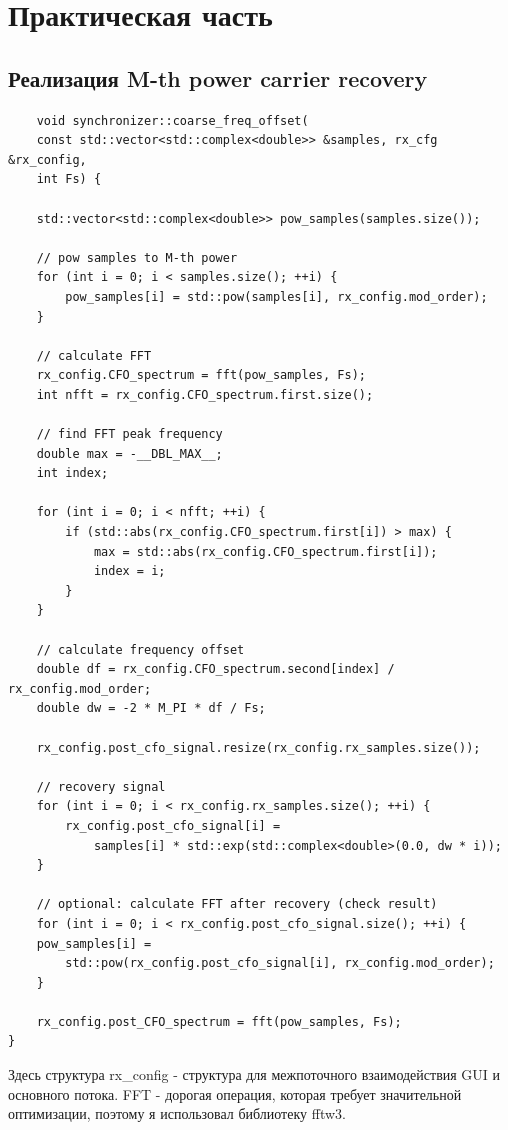 \chapter{Практическая часть}
\label{ch:chap2}

\section{Реализация M-th power carrier recovery}


\begin{lstlisting}
    void synchronizer::coarse_freq_offset(
    const std::vector<std::complex<double>> &samples, rx_cfg &rx_config,
    int Fs) {
    
    std::vector<std::complex<double>> pow_samples(samples.size());

    // pow samples to M-th power
    for (int i = 0; i < samples.size(); ++i) {
        pow_samples[i] = std::pow(samples[i], rx_config.mod_order);
    }

    // calculate FFT
    rx_config.CFO_spectrum = fft(pow_samples, Fs);
    int nfft = rx_config.CFO_spectrum.first.size();

    // find FFT peak frequency
    double max = -__DBL_MAX__;
    int index;

    for (int i = 0; i < nfft; ++i) {
        if (std::abs(rx_config.CFO_spectrum.first[i]) > max) {
            max = std::abs(rx_config.CFO_spectrum.first[i]);
            index = i;
        }
    }

    // calculate frequency offset
    double df = rx_config.CFO_spectrum.second[index] / rx_config.mod_order;
    double dw = -2 * M_PI * df / Fs;

    rx_config.post_cfo_signal.resize(rx_config.rx_samples.size());

    // recovery signal
    for (int i = 0; i < rx_config.rx_samples.size(); ++i) {
        rx_config.post_cfo_signal[i] =
            samples[i] * std::exp(std::complex<double>(0.0, dw * i));
    }

    // optional: calculate FFT after recovery (check result)
    for (int i = 0; i < rx_config.post_cfo_signal.size(); ++i) {
    pow_samples[i] =
        std::pow(rx_config.post_cfo_signal[i], rx_config.mod_order);
    }

    rx_config.post_CFO_spectrum = fft(pow_samples, Fs);
}
\end{lstlisting}

Здесь структура rx\_config - структура для межпоточного взаимодействия GUI и основного потока. FFT - дорогая операция, которая
требует значительной оптимизации, поэтому я использовал библиотеку fftw3. \\

